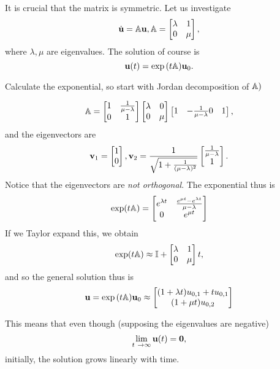 \documentclass[../main.tex]{subfiles}
\begin{document}
It is crucial that the matrix is symmetric. Let us investigate
\[
	\dot{\vb{u}} = \mathbb{A} \vb{u}, \mathbb{A} = \begin{bmatrix}
		\lambda & 1 \\
		0 & \mu
	\end{bmatrix},
\]
where $\lambda, \mu$ are eigenvalues. The solution of course is
\[
	\vb{u}(t) = \exp\qty(t \mathbb{A}) \vb{u}_0.
\]

Calculate the exponential, so start with Jordan decomposition of $\mathbb{A})$

\[
	\mathbb{A} = \begin{bmatrix}
		1 & \frac{1}{\mu - \lambda} \\
		0 & 1 
	\end{bmatrix}
	\begin{bmatrix}
		\lambda & 0 \\
		0 & \mu 
	\end{bmatrix}
	\begin{bmatrix}
		1 & - \frac{1}{\mu - \lambda}
		0 & 1
	\end{bmatrix},
\]
and the eigenvectors are
\[
	\vb{v}_1 = \begin{bmatrix}
		1 \\
		0
		\end{bmatrix}, \vb{v}_2 = \frac{1}{\sqrt{1+ \frac{1}{(\mu-\lambda)^{2}}}}\begin{bmatrix}
		\frac{1}{\mu- \lambda}\\
		1
	\end{bmatrix}.
\]
Notice that the eigenvectors are \textit{not orthogonal}. The exponential thus is
\[
	\exp(t \mathbb{A}) = \begin{bmatrix}
		e^{\lambda t} & \frac{e^{\mu t} - e^{\lambda t}}{\mu - \lambda}\\
		0 & e^{\mu t}
	\end{bmatrix}
\]
If we Taylor expand this, we obtain
\[
	\exp(t \mathbb{A}) \approx \mathbb{I} + \begin{bmatrix}
		\lambda & 1 \\
		0 & \mu
	\end{bmatrix}t,
\]
and so the general solution thus is
\[
	\vb{u} = \exp\qty(t \mathbb{A}) \vb{u}_0 \approx \begin{bmatrix}
		\qty(1+\lambda t)u_{0,1}+ t u_{0,1} \\
		(1+\mu t) u_{0,2}
	\end{bmatrix}
\]

This means that even though (supposing the eigenvalues are negative)
\[
	\lim_{t\ \to \infty} \vb{u}(t) = \vb{0},
\]
initially, the solution grows linearly with time. 
\end{document}
